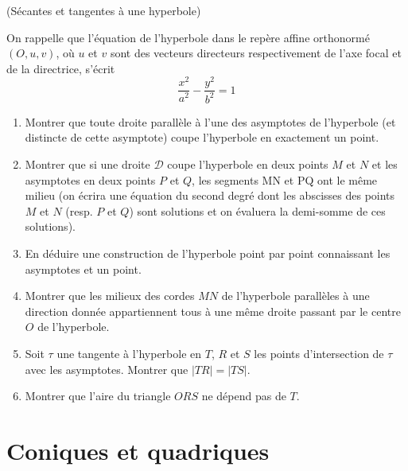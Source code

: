 \documentclass[a4paper,12pt,reqno]{amsart}
\begin{document}
\begin{exo} (Sécantes et tangentes à une hyperbole)


On rappelle que l'équation de l'hyperbole dans le repère affine orthonormé $(O,u,v)$, où $u$ et $v$ sont des vecteurs directeurs respectivement de l'axe focal et de la directrice, s'écrit
$$
  \frac{x^{2}}{a^{2}}-\frac{y^{2}}{b^{2}}=1
$$

\begin{enumerate}
  \item Montrer que toute droite parallèle à l'une des asymptotes de l'hyperbole (et distincte de cette asymptote) coupe l'hyperbole en exactement un point.

  \item Montrer que si une droite $\mathcal{D}$ coupe l'hyperbole en deux points $M$ et $N$ et les asymptotes en deux points $P$ et $Q$, les segments MN et PQ ont le même milieu (on écrira une équation du second degré dont les abscisses des points $M$ et $N$ (resp. $P$ et $Q$) sont solutions et on évaluera la demi-somme de ces solutions).

  \item En déduire une construction de l'hyperbole point par point connaissant les asymptotes et un point.

  \item Montrer que les milieux des cordes $MN$ de l'hyperbole parallèles à une direction donnée appartiennent tous à une même droite passant par le centre $O$ de l'hyperbole.

  \item Soit $\tau$ une tangente à l'hyperbole en $T$, $R$ et $S$ les points d'intersection de $\tau$ avec les asymptotes. Montrer que $| TR | = | TS |$.

  \item Montrer que l'aire du triangle $ORS$ ne dépend pas de $T$.
\end{enumerate}

\end{exo}

\section{Coniques et quadriques}
\end{document}
